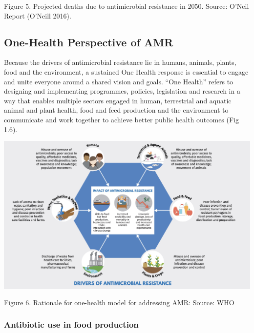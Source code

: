 \documentclass[]{tufte-handout}
\begin{document}
Figure 5. Projected deaths due to antimicrobial resistance in 2050.
Source: O'Neil Report (O'Neill 2016).

\hypertarget{one-health-perspective-of-amr}{%
\subsection*{One-Health Perspective of
AMR}\label{one-health-perspective-of-amr}}

Because the drivers of antimicrobial resistance lie in humans, animals,
plants, food and the environment, a sustained One Health response is
essential to engage and unite everyone around a shared vision and goals.
``One Health'' refers to designing and implementing programmes,
policies, legislation and research in a way that enables multiple
sectors engaged in human, terrestrial and aquatic animal and plant
health, food and feed production and the environment to communicate and
work together to achieve better public health outcomes (Fig 1.6).

\includegraphics[width=8.33333in,height=\textheight]{images/onehealth.jpg}

Figure 6. Rationale for one-health model for addressing AMR: Source: WHO

\hypertarget{antibiotic-use-in-food-production}{%
\subsubsection*{Antibiotic use in food
production}\label{antibiotic-use-in-food-production}}
\end{document}

